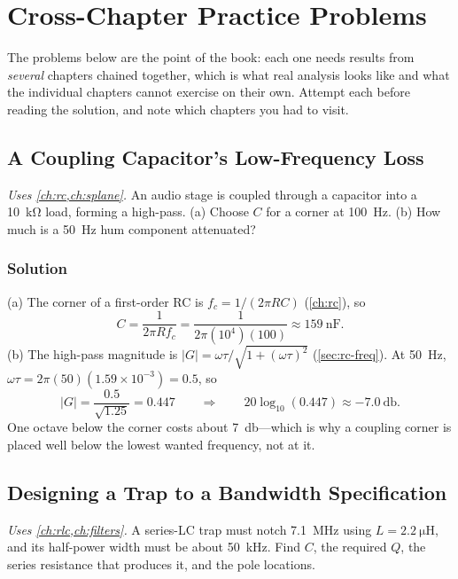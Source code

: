 \chapter{Cross-Chapter Practice Problems}
\label{app:practice}
The problems below are the point of the book: each one needs results from
\emph{several} chapters chained together, which is what real analysis looks like and
what the individual chapters cannot exercise on their own. Attempt each before reading
the solution, and note which chapters you had to visit.

\section{A Coupling Capacitor's Low-Frequency Loss}
\emph{Uses \cref{ch:rc,ch:splane}.} An audio stage is coupled through a capacitor into
a \SI{10}{\kilo\ohm} load, forming a high-pass. (a) Choose \(C\) for a corner at
\SI{100}{\hertz}. (b) How much is a \SI{50}{\hertz} hum component attenuated?

\subsection*{Solution}
(a) The corner of a first-order RC is \(f_c=1/(2\pi RC)\)
(\cref{ch:rc}), so
\[
C=\frac{1}{2\pi R f_c}=\frac{1}{2\pi(10^4)(100)}\approx\SI{159}{\nano\farad}.
\]
(b) The high-pass magnitude is \(|G|=\omega\tau/\sqrt{1+(\omega\tau)^2}\)
(\cref{sec:rc-freq}). At \SI{50}{\hertz}, \(\omega\tau=2\pi(50)(1.59\times10^{-3})=0.5\), so
\[
|G|=\frac{0.5}{\sqrt{1.25}}=0.447
\qquad\Longrightarrow\qquad
20\log_{10}(0.447)\approx-\SI{7.0}{\decibel}.
\]
One octave below the corner costs about \SI{7}{\decibel}---which is why a coupling
corner is placed well below the lowest wanted frequency, not at it.

\section{Designing a Trap to a Bandwidth Specification}
\emph{Uses \cref{ch:rlc,ch:filters}.} A series-LC trap must notch
\SI{7.1}{\mega\hertz} using \(L=\SI{2.2}{\micro\henry}\), and its half-power width
must be about \SI{50}{\kilo\hertz}. Find \(C\), the required \(Q\), the series
resistance that produces it, and the pole locations.

